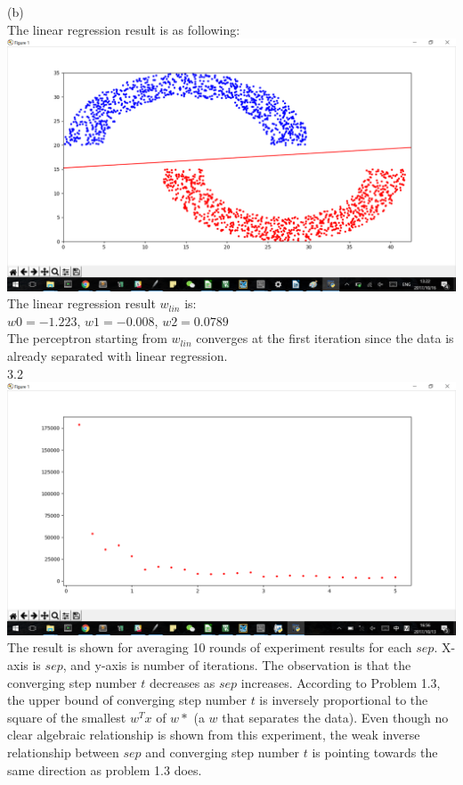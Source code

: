 \documentclass[12pt]{article}
\begin{document}
(b)\\
The linear regression result is as following:\\
\includegraphics[scale=0.6]{3-1b}\\
The linear regression result $w_{lin}$ is:\\ $w0=-1.223$, $w1=-0.008$, $w2=0.0789$\\
The perceptron starting from $w_{lin}$ converges at the first iteration since the data is already separated with linear regression.\\

3.2\\%
\includegraphics[scale=0.6]{3-2}\\
The result is shown for averaging 10 rounds of experiment results for each $sep$. X-axis is $sep$, and y-axis is number of iterations. The observation is that the converging step number $t$ decreases as $sep$ increases. According to Problem 1.3, the upper bound of converging step number $t$ is inversely proportional to the square of the smallest $w^Tx$ of $w*$ (a $w$ that separates the data). Even though no clear algebraic relationship is shown from this experiment, the weak inverse relationship between $sep$ and converging step number $t$ is pointing towards the same direction as problem 1.3 does.
\end{document}

